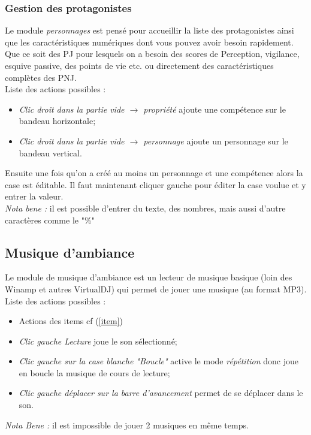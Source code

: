 \documentclass[a4paper,12pt]{article}
\begin{document}
\subsubsection{Gestion des protagonistes}\label{personnage}
Le module \emph{personnages} est pensé pour accueillir la liste des protagonistes ainsi que les caractéristiques numériques dont vous pouvez avoir besoin rapidement. Que ce soit des PJ pour lesquels on a besoin des scores de Perception, vigilance, esquive passive, des points de vie etc. ou directement des caractéristiques complètes des PNJ.
\\
Liste des actions possibles :
\begin{itemize}
    \item \emph{Clic droit dans la partie vide $\rightarrow$ propriété} ajoute une compétence sur le bandeau horizontale;
    \item \emph{Clic droit dans la partie vide $\rightarrow$ personnage} ajoute un personnage sur le bandeau vertical.
\end{itemize}
Ensuite une fois qu'on a créé au moins un personnage et une compétence alors la case est éditable. Il faut maintenant cliquer gauche pour éditer la case voulue et y entrer la valeur.
\\\emph{Nota bene :} il est possible d'entrer du texte, des nombres, mais aussi d'autre caractères comme le "\%"

\subsection{Musique d'ambiance}\label{musique}
Le module de musique d'ambiance est un lecteur de musique basique (loin des Winamp et autres VirtualDJ) qui permet de jouer une musique (au format MP3).
\\
Liste des actions possibles :
\begin{itemize}
    \item Actions des items cf (\ref{item})
    \item \emph{Clic gauche Lecture} joue le son sélectionné;
    \item \emph{Clic gauche sur la case blanche "Boucle"} active le mode \emph{répétition} donc joue en boucle la musique de cours de lecture;
    \item \emph{Clic gauche déplacer sur la barre d'avancement} permet de se déplacer dans le son.
\end{itemize}
\emph{Nota Bene :} il est impossible de jouer 2 musiques en même temps.
\end{document}
